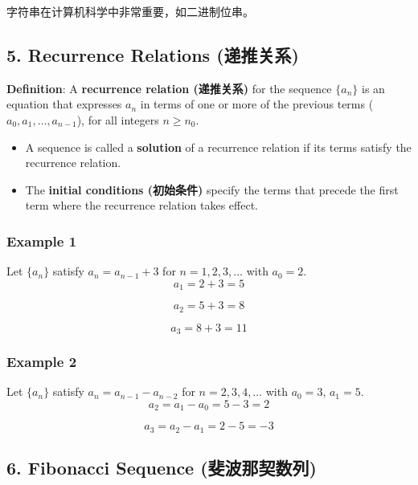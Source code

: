 \documentclass[10pt,a4paper,openany]{ctexbook}
\theoremstyle{definition}
\theoremstyle{remark}
\renewenvironment{quote}
  {\list{}{\leftmargin=1em\rightmargin=0pt\topsep=0.5pt\partopsep=0pt}\item[]}
  {\endlist}
\begin{document}
\begin{quote}
字符串在计算机科学中非常重要，如二进制位串。

\end{quote}
\vspace{-2pt}

\subsection{5. Recurrence Relations (递推关系)}

\textbf{Definition}: A \textbf{recurrence relation (递推关系)} for the sequence $\{a_n\}$ is an equation that expresses $a_n$ in terms of one or more of the previous terms ($a_0, a_1, \dots, a_{n-1}$), for all integers $n \ge n_0$.
\begin{itemize}
\item A sequence is called a \textbf{solution} of a recurrence relation if its terms satisfy the recurrence relation.
\item The \textbf{initial conditions (初始条件)} specify the terms that precede the first term where the recurrence relation takes effect.

\end{itemize}

\subsubsection{Example 1}

Let $\{a_n\}$ satisfy $a_n = a_{n-1} + 3$ for $n = 1,2,3,\dots$ with $a_0 = 2$.
\[
a_1 = 2 + 3 = 5
\]

\[
a_2 = 5 + 3 = 8
\]

\[
a_3 = 8 + 3 = 11
\]

\subsubsection{Example 2}

Let $\{a_n\}$ satisfy $a_n = a_{n-1} - a_{n-2}$ for $n = 2,3,4,\dots$ with $a_0 = 3$, $a_1 = 5$.
\[
a_2 = a_1 - a_0 = 5 - 3 = 2
\]

\[
a_3 = a_2 - a_1 = 2 - 5 = -3
\]

\vspace{-2pt}

\subsection{6. Fibonacci Sequence (斐波那契数列)}
\end{document}
